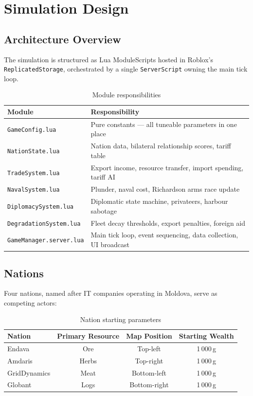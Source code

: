 \documentclass[12pt,a4paper]{article}
\begin{document}
\section{Simulation Design}

\subsection{Architecture Overview}

The simulation is structured as Lua ModuleScripts hosted in Roblox's \texttt{ReplicatedStorage}, orchestrated by a single \texttt{ServerScript} owning the main tick loop.

\begin{table}[h]
\centering
\caption{Module responsibilities}
\begin{tabular}{|l|p{8.5cm}|}
\hline
\textbf{Module} & \textbf{Responsibility} \\
\hline
\texttt{GameConfig.lua}           & Pure constants --- all tuneable parameters in one place \\
\hline
\texttt{NationState.lua}          & Nation data, bilateral relationship scores, tariff table \\
\hline
\texttt{TradeSystem.lua}          & Export income, resource transfer, import spending, tariff AI \\
\hline
\texttt{NavalSystem.lua}          & Plunder, naval cost, Richardson arms race update \\
\hline
\texttt{DiplomacySystem.lua}      & Diplomatic state machine, privateers, harbour sabotage \\
\hline
\texttt{DegradationSystem.lua}    & Fleet decay thresholds, export penalties, foreign aid \\
\hline
\texttt{GameManager.server.lua}   & Main tick loop, event sequencing, data collection, UI broadcast \\
\hline
\end{tabular}
\end{table}

\subsection{Nations}

Four nations, named after IT companies operating in Moldova, serve as competing actors:

\begin{table}[h]
\centering
\caption{Nation starting parameters}
\begin{tabular}{|l|c|c|c|}
\hline
\textbf{Nation} & \textbf{Primary Resource} & \textbf{Map Position} & \textbf{Starting Wealth} \\
\hline
Endava       & Ore   & Top-left     & 1\,000\,g \\
Amdaris      & Herbs & Top-right    & 1\,000\,g \\
GridDynamics & Meat  & Bottom-left  & 1\,000\,g \\
Globant      & Logs  & Bottom-right & 1\,000\,g \\
\hline
\end{tabular}
\end{table}
\end{document}
